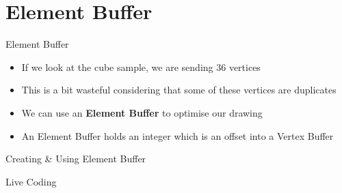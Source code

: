 \part{Element Buffer}
\frame{\partpage}

\begin{frame}{Element Buffer}
	\begin{itemize}
		\pause\item If we look at the cube sample, we are sending 36 vertices
		\pause\item This is a bit wasteful considering that some of these vertices are duplicates
		\pause\item We can use an \textbf{Element Buffer} to optimise our drawing
		\pause\item An Element Buffer holds an integer which is an offset into a Vertex Buffer
	\end{itemize}
\end{frame}

\begin{frame}{Creating \& Using Element Buffer}
	\begin{center}
		Live Coding
	\end{center}
\end{frame}


